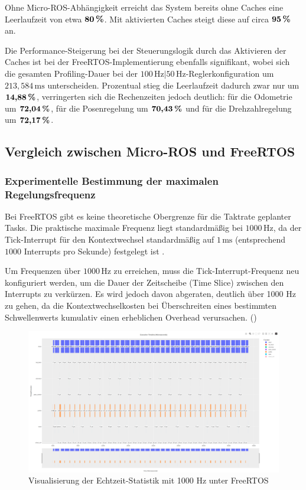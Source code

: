 Ohne Micro-ROS-Abhängigkeit erreicht das System bereits ohne Caches eine
Leerlaufzeit von etwa $\textbf{80\,\%}$. Mit aktivierten Caches steigt diese auf
circa $\textbf{95\,\%}$ an.

Die Performance-Steigerung bei der Steuerungslogik durch das Aktivieren der
Caches ist bei der FreeRTOS-Implementierung ebenfalls signifikant, wobei sich
die gesamten Profiling-Dauer bei der
$100\,\text{Hz}|50\,\text{Hz}$-Reglerkonfiguration um $213,584\,\text{ms}$
unterscheiden. Prozentual stieg die Leerlaufzeit dadurch zwar nur um
$\textbf{14,88\,\%}$, verringerten sich die Rechenzeiten jedoch deutlich: für
die Odometrie um $\textbf{72,04\,\%}$, für die Posenregelung um
$\textbf{70,43\,\%}$ und für die Drehzahlregelung um $\textbf{72,17\,\%}$.

\subsection{Vergleich zwischen Micro-ROS und FreeRTOS}

\subsubsection{Experimentelle Bestimmung der maximalen Regelungsfrequenz}

Bei FreeRTOS gibt es keine theoretische Obergrenze für die Taktrate geplanter
Tasks. Die praktische maximale Frequenz liegt standardmäßig bei
$1000\,\text{Hz}$, da der Tick-Interrupt für den Kontextwechsel standardmäßig
auf $1\,\text{ms}$ (entsprechend $1000$ Interrupts pro Sekunde) festgelegt ist
\cite{FreertosTasks}.

Um Frequenzen über $1000\,\text{Hz}$ zu erreichen, muss die
Tick-Interrupt-Frequenz neu konfiguriert werden, um die Dauer der Zeitscheibe
(Time Slice) zwischen den Interrupts zu verkürzen. Es wird jedoch davon
abgeraten, deutlich über 1000 Hz zu gehen, da die Kontextwechselkosten bei
Überschreiten eines bestimmten Schwellenwerts kumulativ einen erheblichen
Overhead verursachen. (\cite{FreertosForumHF2019, FreertosTickRate2010})

\begin{figure}[H]
    \centering
    \includegraphics[width=1\textwidth]{assets/freertos_profiling_1000hz}
    \caption{Visualisierung der Echtzeit-Statistik mit 1000 Hz unter FreeRTOS}
\end{figure}

